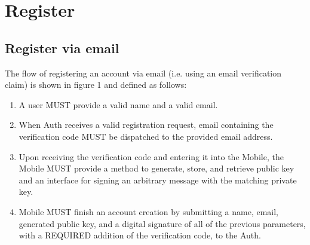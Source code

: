 \section{Register}

    \subsection{Register via email}
    The flow of registering an account via email (i.e. using an email verification claim) is shown in figure 1 and
    defined as follows:
    \begin{enumerate}
        \item A user MUST provide a valid name and a valid email.
        \item When Auth receives a valid registration request, email containing the verification code MUST 
                be dispatched to the provided email address.
        \item Upon receiving the verification code and entering it into the Mobile, the Mobile MUST provide 
                a method to generate, store, and retrieve public key and an interface for signing an arbitrary 
                message with the matching private key.
        \item Mobile MUST finish an account creation by submitting a name, email, generated public key, and 
                a digital signature of all of the previous parameters, with a REQUIRED addition of the 
                verification code, to the Auth.
    \end{enumerate}
  
    

